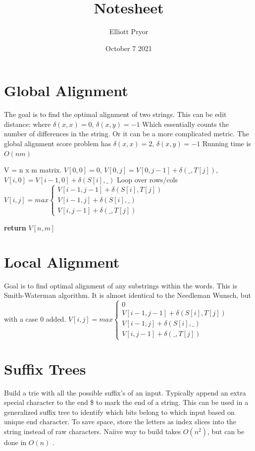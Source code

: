 \documentclass[10pt]{article}
\title{Notesheet}
\author{Elliott Pryor}
\date{October 7 2021}
\begin{document}


\section{Global Alignment}
The goal is to find the optimal alignment of two strings.
This can be edit distance: where $\delta(x, x) = 0$, $\delta(x, y) = -1$
Which essentially counts the number of differences in the string. Or it can be a more complicated metric.
The global alignment score problem has $\delta(x, x) = 2$, $\delta(x,y) = -1$
Running time is $O(nm)$
\begin{algorithm}[H]
    \begin{algorithmic}[1]
    \tiny
        \State V = n x m matrix.
        \State $V[0,0] = 0$, $V[0,j] = V[0,j-1] + \delta(\_, T[j])$, $V[i,0] = V[i-1,0] + \delta(S[i], \_)$
        \State Loop over rows/cols
        \State $V[i,j] = max \begin{cases}
            V[i-1, j-1] + \delta(S[i], T[j]) \\
            V[i-1, j] + \delta(S[i], \_) \\
            V[i, j-1] + \delta(\_, T[j])
        \end{cases}$

    \State \textbf{return} $V[n, m]$
    \EndFunction
    \end{algorithmic}
\end{algorithm}


\section{Local Alignment}
Goal is to find optimal alignment of any substrings within the words.
This is Smith-Waterman algorithm. It is almost identical to the Needleman Wunsch,
but with a case 0 added. $V[i,j] = max \begin{cases}
    0 \\
    V[i-1, j-1] + \delta(S[i], T[j]) \\
    V[i-1, j] + \delta(S[i], \_) \\
    V[i, j-1] + \delta(\_, T[j])
\end{cases}$ 

\section{Suffix Trees}
Build a trie with all the possible suffix's of an input.
Typically append an extra special character to the end \$ to mark the end of a string.
This can be used in a generalized suffix tree to identify which bits belong to which input based on unique end character.
To save space, store the letters as index slices into the string instead of raw characters.
Naiive way to build takes $O(n^2)$, but can be done in $O(n)$ .
\end{document}
